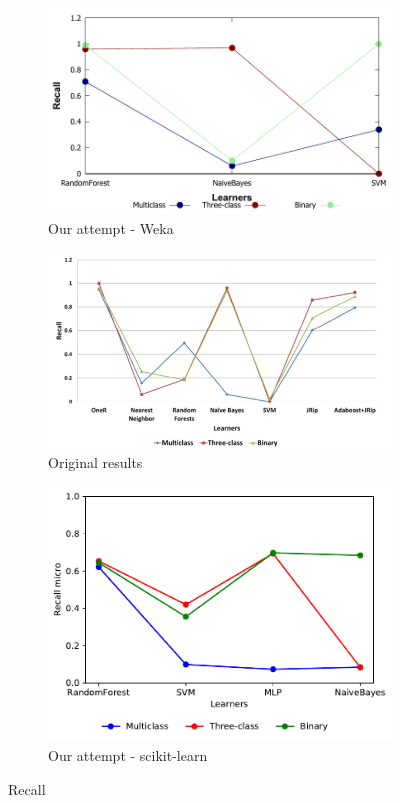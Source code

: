 \begin{figure}[H]
    \centering
    \begin{subfigure}[t]{0.4\textwidth}
        \includegraphics[width=\linewidth]{images/weka_recall}
        \caption{Our attempt - Weka}
    \end{subfigure}%
    \begin{subfigure}[t]{0.4\textwidth}
        \includegraphics[width=\linewidth]{images/weka_recall_cite.png}
        \caption{Original results \cite{borges_hink_machine_2014-1}}
    \end{subfigure}
    \begin{subfigure}[t]{0.4\textwidth}
        \includegraphics[width=\linewidth, page = 2]{images/recall}
        \caption{Our attempt - scikit-learn}
    \end{subfigure}
    \caption{Recall}
    \label{fig:recall}
\end{figure}

